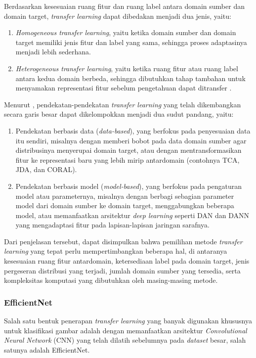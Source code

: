 Berdasarkan kesesuaian ruang fitur dan ruang label antara domain sumber dan domain target, \textit{transfer learning} dapat dibedakan menjadi dua jenis, yaitu:
\begin{enumerate}
	\item \textit{Homogeneous transfer learning}, yaitu ketika domain sumber dan domain target memiliki jenis fitur dan label yang sama, sehingga proses adaptasinya menjadi lebih sederhana.
	\item \textit{Heterogeneous transfer learning}, yaitu ketika ruang fitur atau ruang label antara kedua domain berbeda, sehingga dibutuhkan tahap tambahan untuk menyamakan representasi fitur sebelum pengetahuan dapat ditransfer \cite{zhuang2020comprehensive}.
\end{enumerate}

Menurut \cite{zhuang2020comprehensive}, pendekatan-pendekatan \textit{transfer learning} yang telah dikembangkan secara garis besar dapat dikelompokkan menjadi dua sudut pandang, yaitu:
\begin{enumerate}
	\item Pendekatan berbasis data (\textit{data-based}), yang berfokus pada penyesuaian data itu sendiri, misalnya dengan memberi bobot pada data domain sumber agar distribusinya menyerupai domain target, atau dengan mentransformasikan fitur ke representasi baru yang lebih mirip antardomain (contohnya TCA, JDA, dan CORAL).
	\item Pendekatan berbasis model (\textit{model-based}), yang berfokus pada pengaturan model atau parameternya, misalnya dengan berbagi sebagian parameter model dari domain sumber ke domain target, menggabungkan beberapa model, atau memanfaatkan arsitektur \textit{deep learning} seperti DAN dan DANN yang mengadaptasi fitur pada lapisan-lapisan jaringan sarafnya.
\end{enumerate}

Dari penjelasan tersebut, dapat disimpulkan bahwa pemilihan metode \textit{transfer learning} yang tepat perlu mempertimbangkan beberapa hal, di antaranya kesesuaian ruang fitur antardomain, ketersediaan label pada domain target, jenis pergeseran distribusi yang terjadi, jumlah domain sumber yang tersedia, serta kompleksitas komputasi yang dibutuhkan oleh masing-masing metode.

\subsubsection{EfficientNet}
Salah satu bentuk penerapan \textit{transfer learning} yang banyak digunakan khususnya untuk klasifikasi gambar adalah dengan memanfaatkan arsitektur \textit{Convolutional Neural Network} (CNN) yang telah dilatih sebelumnya pada \textit{dataset} besar, salah satunya adalah EfficientNet.


